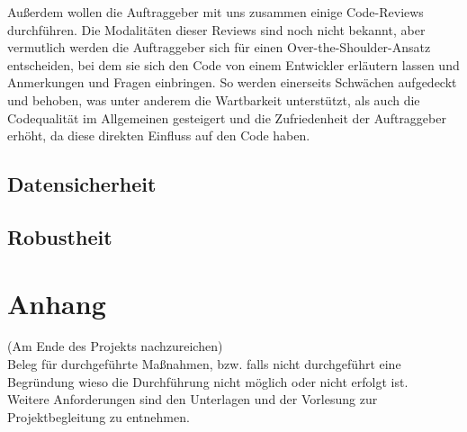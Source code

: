 \documentclass[accentcolor=tud0b,12pt,paper=a4]{tudreport}
\begin{document}
                Außerdem wollen die Auftraggeber mit uns zusammen einige Code-Reviews durchführen. Die Modalitäten dieser Reviews sind noch nicht bekannt, aber vermutlich werden die Auftraggeber sich für einen Over-the-Shoulder-Ansatz entscheiden, bei dem sie sich den Code von einem Entwickler erläutern lassen und Anmerkungen und Fragen einbringen. So werden einerseits Schwächen aufgedeckt und behoben, was unter anderem die Wartbarkeit unterstützt, als auch die Codequalität im Allgemeinen gesteigert und die Zufriedenheit der Auftraggeber erhöht, da diese direkten Einfluss auf den Code haben.

                \newpage
        \section{Datensicherheit}

        \section{Robustheit}

\appendix
  \chapter{Anhang}
    (Am Ende des Projekts nachzureichen)\\
    Beleg für durchgeführte Maßnahmen, bzw. falls nicht durchgeführt eine Begründung wieso die Durchführung nicht möglich oder nicht erfolgt ist. \\
    Weitere Anforderungen sind den Unterlagen und der Vorlesung zur Projektbegleitung zu entnehmen.
\end{document}
